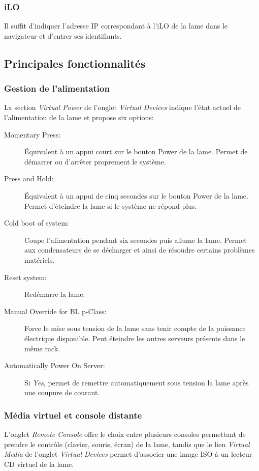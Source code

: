 \documentclass[a4paper,oneside]{report}
\begin{document}
\subsubsection{iLO}
Il suffit d'indiquer l'adresse IP correspondant à l'iLO de la lame dans le navigateur et d'entrer ses identifiants.

\subsection{Principales fonctionnalités}
\subsubsection{Gestion de l'alimentation}
La section \emph{Virtual Power} de l'onglet \emph{Virtual Devices} indique l'état actuel de l'alimentation de la lame et propose six options:
\begin{description}
\item[Momentary Press:] Équivalent à un appui court sur le bouton Power de la lame.
Permet de démarrer ou d'arrêter proprement le système.
\item[Press and Hold:] Équivalent à un appui de cinq secondes sur le bouton Power de la lame.
Permet d'éteindre la lame si le système ne répond plus.
\item[Cold boot of system:] Coupe l'alimentation pendant six secondes puis allume la lame.
Permet aux condensateurs de se décharger et ainsi de résoudre certains problèmes matériels.
\item[Reset system:] Redémarre la lame.
\item[Manual Override for BL p-Class:] Force le mise sous tension de la lame sans tenir compte de la puissance électrique disponible.
Peut éteindre les autres serveurs présents dans le même rack.
\item[Automatically Power On Server:] Si \emph{Yes}, permet de remettre automatiquement sous tension la lame après une coupure de courant.
\end{description}

\subsubsection{Média virtuel et console distante}
L'onglet \emph{Remote Console} offre le choix entre plusieurs consoles permettant de prendre le contrôle (clavier, souris, écran) de la lame, tandis que le lien \emph{Virtual Media} de l'onglet \emph{Virtual Devices} permet d'associer une image ISO à un lecteur CD virtuel de la lame.
\end{document}
